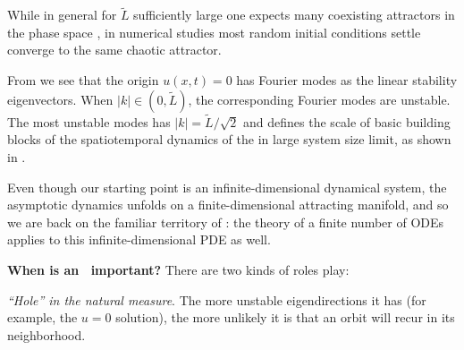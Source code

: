 While in general
for $\tilde{L}$ sufficiently large
one expects many 
coexisting attractors in the phase space%
 ,
in numerical studies most random initial
conditions settle converge to the same chaotic attractor. 

From  we see that the origin $u(x,t) = 0$
has Fourier modes as the  linear
stability eigenvectors. 
When $|k| \in (0,\tilde{L})$, the corresponding Fourier modes are
unstable.
The most unstable modes has $|k|=\tilde{L}/\sqrt{2}$ and defines the scale of basic building
blocks of the spatiotemporal dynamics of the {\KSe} in large system size limit,
as shown in . 


% 
% 
% 
Even though our starting point
is an infinite-dimensional dynamical system, the asymptotic dynamics
unfolds on a finite-dimensional attracting manifold, and so we are back on
the familiar territory of :
the theory of a finite number of ODEs applies to this
infinite-dimensional PDE as well.

    {\bf When is an \eqv\ important?} There are two kinds of roles
{\eqva} play:

{\em ``Hole'' in the natural measure}.
The more unstable eigendirections it has (for example, the
$u=0$ solution), the more unlikely it is  that
an orbit will recur in its neighborhood.

